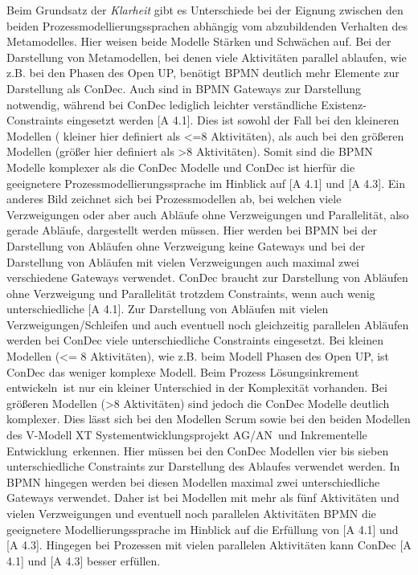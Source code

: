 {Beim Grundsatz der \textit{Klarheit} gibt es Unterschiede bei der Eignung zwischen den beiden Prozessmodellierungssprachen abhängig vom abzubildenden Verhalten des Metamodelles. Hier weisen beide Modelle Stärken und Schwächen auf. \newline
Bei der Darstellung von Metamodellen, bei denen viele Aktivitäten parallel ablaufen, wie z.B. bei den Phasen des Open UP, benötigt BPMN deutlich mehr Elemente zur Darstellung als ConDec. Auch sind in BPMN Gateways zur Darstellung notwendig, während bei ConDec lediglich leichter verständliche Existenz-Constraints eingesetzt werden [A 4.1]. Dies ist sowohl der Fall bei den kleineren Modellen ( kleiner hier definiert als <=8 Aktivitäten), als auch bei den größeren Modellen (größer hier definiert als >8 Aktivitäten). Somit sind die BPMN Modelle komplexer als die ConDec Modelle und ConDec ist hierfür die geeignetere Prozessmodellierungssprache im Hinblick auf [A 4.1] und [A 4.3]. \newline
Ein anderes Bild zeichnet sich bei Prozessmodellen ab, bei welchen viele Verzweigungen oder aber auch Abläufe ohne Verzweigungen und Parallelität, also gerade Abläufe, dargestellt werden müssen. Hier werden bei BPMN bei der Darstellung von Abläufen ohne Verzweigung keine Gateways und bei der Darstellung von Abläufen mit vielen Verzweigungen auch maximal zwei verschiedene Gateways verwendet. ConDec braucht zur Darstellung von Abläufen ohne Verzweigung und Parallelität trotzdem Constraints, wenn auch wenig unterschiedliche [A 4.1]. Zur Darstellung von Abläufen mit vielen Verzweigungen/Schleifen und auch eventuell noch gleichzeitig parallelen Abläufen werden bei ConDec viele unterschiedliche Constraints eingesetzt. Bei kleinen Modellen (<= 8 Aktivitäten), wie z.B. beim Modell \grqq Phasen des Open UP\grqq, ist ConDec das weniger komplexe Modell. Beim Prozess \grqq Lösungsinkrement entwickeln\grqq \ ist nur ein kleiner Unterschied in der Komplexität vorhanden. Bei größeren Modellen (>8 Aktivitäten) sind jedoch die ConDec Modelle deutlich komplexer. Dies lässt sich bei den Modellen Scrum sowie bei den beiden Modellen des V-Modell XT \grqq Systementwicklungsprojekt AG/AN\grqq \ und \grqq Inkrementelle Entwicklung\grqq \ erkennen. Hier müssen bei den ConDec Modellen vier bis sieben unterschiedliche Constraints zur Darstellung des Ablaufes verwendet werden. In BPMN hingegen werden bei diesen Modellen maximal zwei unterschiedliche Gateways verwendet. Daher ist bei Modellen mit mehr als fünf Aktivitäten und vielen Verzweigungen und eventuell noch parallelen Aktivitäten BPMN die geeignetere Modellierungssprache im Hinblick auf die Erfüllung von [A 4.1] und [A 4.3]. Hingegen bei Prozessen mit vielen parallelen Aktivitäten kann ConDec [A 4.1] und [A 4.3] besser erfüllen.\newline

}
